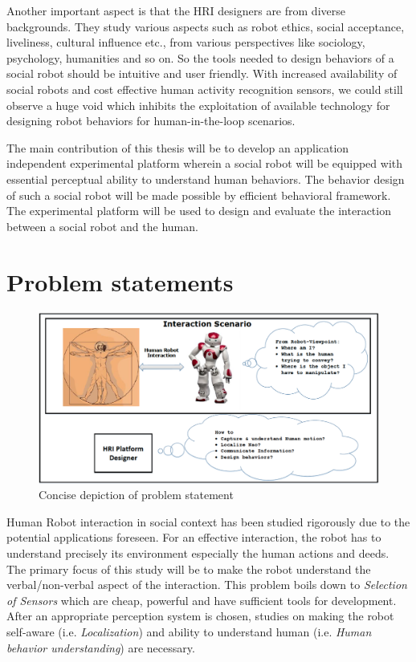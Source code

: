 	Another important aspect is that the HRI designers are from diverse backgrounds. They study various aspects such as robot ethics, social acceptance, liveliness, cultural influence etc., from various perspectives like sociology, psychology, humanities and so on. So the tools needed to design behaviors of a social robot should be intuitive and user friendly.  With increased availability of social robots and cost effective human activity recognition sensors, we could still observe a huge void which inhibits the exploitation of available technology for designing robot behaviors for human-in-the-loop scenarios.
	
	The main contribution of this thesis will be to develop an application independent experimental platform wherein a social robot will be equipped with essential perceptual ability to understand human behaviors. The behavior design of such a social robot will be made possible by efficient behavioral framework. The experimental platform will be used to design and evaluate the interaction between a social robot and the human.	

\section{Problem statements}
\label{sec:problem_statement}
\begin{figure}[H]
\centering
\includegraphics[width=\textwidth]{assets/ProblemStatement.png}
\caption{Concise depiction of problem statement}
\label{fig:problemstatement}
\end{figure}%
	Human Robot interaction in social context has been studied rigorously due to the potential applications foreseen. For an effective interaction, the robot has to understand precisely its environment especially the human actions and deeds. The primary focus of this study will be to make the robot understand the verbal/non-verbal aspect of the interaction. This problem boils down to \emph{Selection of Sensors} which are cheap, powerful and have sufficient tools for development. After an appropriate perception system is chosen, studies on making the robot self-aware (i.e. \emph{Localization}) and ability to understand human (i.e. \emph{Human behavior understanding}) are necessary.
	
